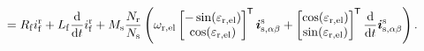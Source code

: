 \begin{frame}
\begin{equation*}
\begin{split}
			&= R_\mathrm{f} i^\mathrm{r}_\mathrm{f} + L_\mathrm{f} \frac{\mathrm{d}}{\mathrm{d}t}i^\mathrm{r}_\mathrm{f} + M_{\mathrm{s}}\frac{N_\mathrm{r}}{N_\mathrm{s}} \left(\omega_\mathrm{r,el}\begin{bmatrix}-\sin(\varepsilon_\mathrm{r,el})\\ \cos(\varepsilon_\mathrm{r,el})\end{bmatrix}^{\mkern-1.5mu\mathsf{T}} \bm{i}^\mathrm{s}_\mathrm{s,\alpha\beta}  + \begin{bmatrix}\cos(\varepsilon_\mathrm{r,el})\\ \sin(\varepsilon_\mathrm{r,el})\end{bmatrix}^{\mkern-1.5mu\mathsf{T}} \frac{\mathrm{d}}{\mathrm{d}t}\bm{i}^\mathrm{s}_\mathrm{s,\alpha\beta}\right).
		\end{split}
	\end{equation*}
\end{frame}

